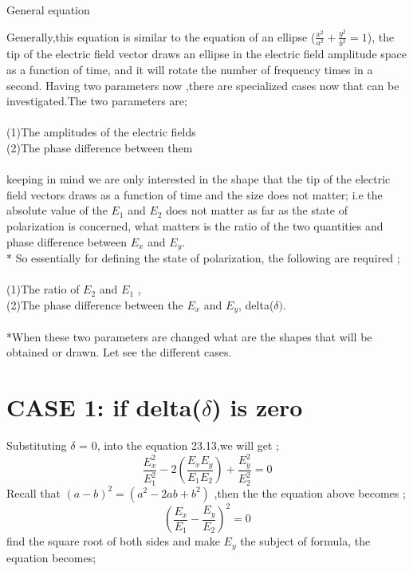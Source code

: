 \begin{center}
	General equation 
\end{center}

Generally,this equation is similar to the equation of an ellipse ($\frac{x^2}{a^2} + \frac{y^2}{b^2} = 1 $), the tip of the electric field vector draws an ellipse in the electric field amplitude space as a function of time, and it will rotate the number of frequency times in a second. Having two parameters now ,there are specialized cases now that can be investigated.The two parameters are;\\
\\(1)The amplitudes of the electric fields \\
(2)The phase difference between them \\
\\keeping in mind we are only interested in the shape that the tip of the electric field vectors draws as a function of time and the size does not matter; i.e the absolute value of the $ E_1 $ and $ E_2 $ does not matter as far as the state of polarization is concerned, what matters is the ratio of the two quantities and phase difference between $ E_x $ and $ E_y $.\\
* So essentially for defining the state of polarization, the following  are required ;\\ 
\\(1)The ratio of $ E_2 $ and $ E_1 $ ,\\ 
(2)The phase difference between the $ E_x $ and $ E_y $, delta($\delta).$\\ \\
*When these two parameters are changed what are the shapes that will be obtained or drawn. Let see the different cases.\\
\section{CASE 1: if delta($\delta $) is zero}
Substituting $\delta$ = 0, into the equation 23.13,we will get ;
	\begin{equation}
\frac{E_{x}^2}{E_{1}^2} -2(\frac{E_{x}E_{y}}{E_{1}E_{2}}) + \frac{E_{y}^2}{E_{2}^2} = 0
\end{equation}
Recall that $(a - b)^2 = (a^2 -2ab +b^2)$ ,then the the equation above becomes ;
	\begin{equation}
(\frac{E_x}{E_1} - \frac{E_y}{E_2})^2 = 0
\end{equation}
find the square root of both sides and make $ E_y $ the subject of formula, the equation becomes;

